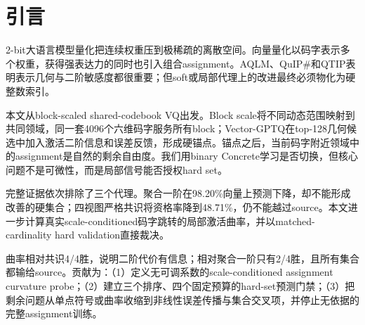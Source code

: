 \section{引言}

2-bit大语言模型量化把连续权重压到极稀疏的离散空间。向量量化以码字表示多个权重，获得强表达力的同时也引入组合assignment。AQLM、QuIP\#和QTIP表明表示几何与二阶敏感度都很重要\cite{aqlm,quip,qtip}；但soft或局部代理上的改进最终必须物化为硬整数索引。

本文从block-scaled shared-codebook VQ出发。Block scale将不同动态范围映射到共同领域，同一套4096个六维码字服务所有block；Vector-GPTQ在top-128几何候选中加入激活二阶信息和误差反馈，形成硬锚点。锚点之后，当前码字附近领域中的assignment是自然的剩余自由度。我们用binary Concrete学习是否切换，但核心问题不是可微性，而是局部信号能否授权hard set。

完整证据依次排除了三个代理。聚合一阶在98.20\%向量上预测下降，却不能形成改善的硬集合；四视图严格共识将资格率降到48.71\%，仍不能越过source。本文进一步计算真实scale-conditioned码字跳转的局部激活曲率，并以matched-cardinality hard validation直接裁决。

曲率相对共识4/4胜，说明二阶代价有信息；相对聚合一阶只有2/4胜，且所有集合都输给source。贡献为：（1）定义无可调系数的scale-conditioned assignment curvature probe；（2）建立三个排序、四个固定预算的hard-set预测门禁；（3）把剩余问题从单点符号或曲率收缩到非线性误差传播与集合交叉项，并停止无依据的完整assignment训练。
